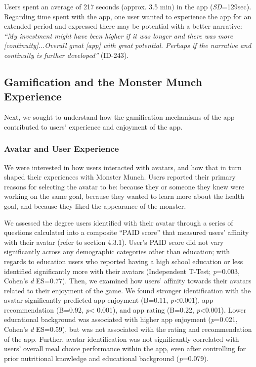 Users spent an average of 217 seconds (approx. 3.5 min) in the app (\textit{SD}=129sec). Regarding time spent with the app, one user wanted to experience the app for an extended period and expressed there may be potential with a better narrative: \textit{``My investment might have been higher if it was longer and there was more [continuity]...Overall great [app] with great potential. Perhaps if the narrative and continuity is further developed''} (ID-243). 


\vspace{-5pt}
\subsection{Gamification and the Monster Munch Experience}
Next, we sought to understand how the gamification mechanisms of the app contributed to users' experience and enjoyment of the app. 
\vspace{-5pt}
\subsubsection {Avatar and User Experience}
We were interested in how users interacted with avatars, and how that in turn shaped their experiences with Monster Munch. Users reported their primary reasons for selecting the avatar to be: because they or someone they knew were working on the same goal, because they wanted to learn more about the health goal, and because they liked the appearance of the monster.

We assessed the degree users identified with their avatar through a series of questions calculated into a composite ``PAID score'' that measured users' affinity with their avatar (refer to section 4.3.1). 
User's PAID score did not vary significantly across any demographic categories other than education; with regards to education users who reported having a high school education or less identified significantly more with their avatars (Independent T-Test; \textit{p}=0.003, Cohen's \textit{d} ES=0.77). 
Then, we examined  how users' affinity towards their avatars related to their enjoyment of the game. We found stronger identification with the avatar significantly predicted app enjoyment (B=0.11, \textit{p}<0.001), app recommendation (B=0.92, \textit{p}< 0.001), and app rating (B=0.22, \textit{p}<0.001).
Lower educational background was associated with higher app enjoyment (\textit{p}=0.021, Cohen's \textit{d} ES=0.59), but was not associated with the rating and recommendation of the app.
Further, avatar identification was not significantly correlated with users' overall meal choice performance within the app, even after controlling for prior nutritional knowledge and educational background (\textit{p}=0.079). 

